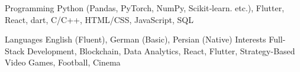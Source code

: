 

\begin{cvskills}

  \cvskill
    {Programming} %
    {Python (Pandas, PyTorch, NumPy, Scikit‑learn. etc.), Flutter, React, dart, C/C++, HTML/CSS, JavaScript, SQL} %

  \cvskill
    {Languages} %
    {English (Fluent), German (Basic), Persian (Native)} %
  \cvskill
    {Interests} %
    {Full-Stack Development, Blockchain, Data Analytics, React, Flutter, Strategy-Based Video Games, Football, Cinema} %

\end{cvskills}
